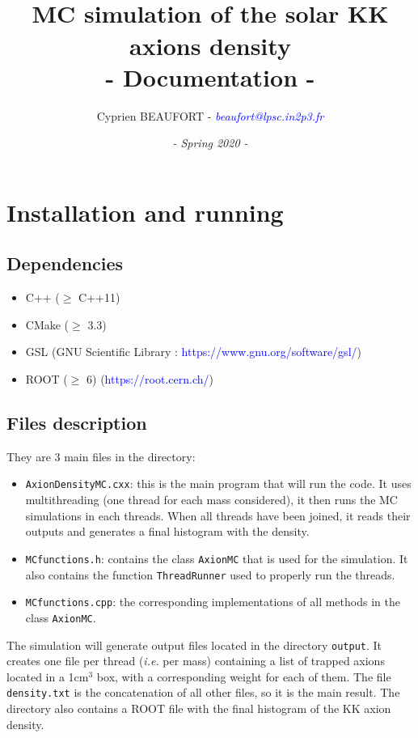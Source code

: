\documentclass[a4paper]{article} %
\title{\vspace{-1cm}\hrulefill \\ \vspace*{0.25cm} \Huge\textbf{MC simulation of the solar KK axions density}
\\ - Documentation -\\ \hrulefill }%
\date{\textit{- Spring 2020 -}}
\author{Cyprien BEAUFORT - \textcolor{blue}{\textit{beaufort@lpsc.in2p3.fr}}}
\begin{document}
\maketitle

\tableofcontents

\section{Installation and running}
	\subsection{Dependencies}
	
	\begin{itemize}
		\item[\textbullet] C++ ($\geq$ C++11)
		\item[\textbullet] CMake ($\geq$ 3.3)
		\item[\textbullet] GSL (GNU Scientific Library : \textcolor{blue}{https://www.gnu.org/software/gsl/})
		\item[\textbullet] ROOT ($\geq$ 6) (\textcolor{blue}{https://root.cern.ch/}) 
	\end{itemize}
	
\subsection{Files description}

They are 3 main files in the directory:
\begin{itemize}
	\item[\textbullet] \texttt{AxionDensityMC.cxx}: this is the main program that will run the code. It uses multithreading (one thread for each mass considered), it then runs the MC simulations in each threads. When all threads have been joined, it reads their outputs and generates a final histogram with the density.
	\item[\textbullet] \texttt{MCfunctions.h}: contains the class \texttt{AxionMC} that is used for the simulation. It also contains the function \texttt{ThreadRunner} used to properly run the threads.
	\item[\textbullet] \texttt{MCfunctions.cpp}: the corresponding implementations of all methods in the class \texttt{AxionMC}.\\
\end{itemize}
	
	The simulation will generate output files located in the directory \texttt{output}. It creates one file per thread (\textit{i.e.} per mass) containing a list of trapped axions located in a 1cm$^3$ box, with a corresponding weight for each of them. The file \texttt{density.txt} is the concatenation of all other files, so it is the main result. The directory also contains a ROOT file with the final histogram of the KK axion density.\\
	
\end{document}

